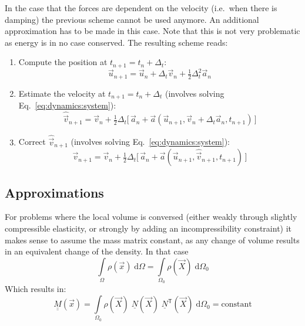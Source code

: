 \documentclass[times,namecite]{goose-article}
\begin{document}
In the case that the forces are dependent on the velocity (i.e.\ when there is damping) the previous scheme cannot be used anymore. An additional approximation has to be made in this case. Note that this is not very problematic as energy is in no case conserved. The resulting scheme reads:

\begin{enumerate}
  \item Compute the position at $t_{n+1} = t_{n} + \Delta_t$:
  \begin{equation}
    \vec{u}_{n+1}
    =
    \vec{u}_{n} + \Delta_t \vec{v}_{n} + \tfrac{1}{2} \Delta_t^2 \vec{a}_{n}
  \end{equation}
  \item Estimate the velocity at $t_{n+1} = t_{n} + \Delta_t$ (involves solving Eq.~\eqref{eq:dynamics:system}):
  \begin{equation}
    \hat{\vec{v}}_{n+1}
    =
    \vec{v}_{n}
    +
    \tfrac{1}{2} \Delta_t \Big[\,
      \vec{a}_{n} + \vec{a} ( \vec{u}_{n+1} , \vec{v}_{n} + \Delta_t \vec{a}_{n} , t_{n+1} ) \,
    \Big]
  \end{equation}
  \item Correct $\hat{\vec{v}}_{n+1}$ (involves solving Eq.~\eqref{eq:dynamics:system}):
  \begin{equation}
    \vec{v}_{n+1}
    =
    \vec{v}_{n}
    +
    \tfrac{1}{2} \Delta_t \Big[\,
      \vec{a}_{n} + \vec{a} ( \vec{u}_{n+1} , \hat{\vec{v}}_{n+1} , t_{n+1} ) \,
    \Big]
  \end{equation}
\end{enumerate}

\subsection{Approximations}

For problems where the local volume is conversed (either weakly through slightly compressible elasticity, or strongly by adding an incompressibility constraint) it makes sense to assume the mass matrix constant, as any change of volume results in an equivalent change of the density. In that case
\begin{equation}
  \int\limits_{\Omega}
    \rho(\vec{x})
  \;\mathrm{d}\Omega
  =
  \int\limits_{\Omega_0}
    \rho(\vec{X})
  \;\mathrm{d}\Omega_0
\end{equation}
Which results in:
\begin{equation}
  \underline{\underline{M}}(\vec{x})
  =
  \int\limits_{\Omega_0}
    \rho(\vec{X})\; \underline{N}(\vec{X})\; \underline{N}^\mathsf{T}(\vec{X}) \;
  \mathrm{d}\Omega_0
  =
  \mathrm{constant}
\end{equation}
\end{document}
